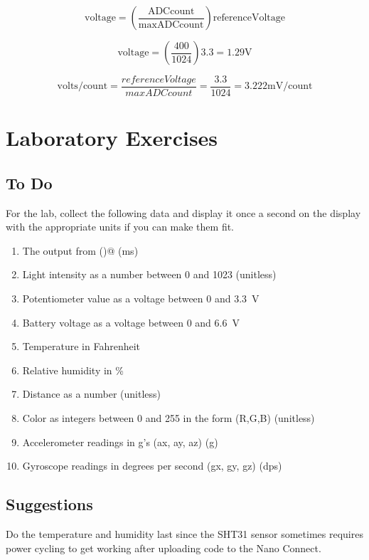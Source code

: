 \begin{equation}
	\label{eq:adc2volt}
	\mathrm{voltage} = \left(\frac{\mathrm{ADCcount}}{\mathrm{maxADCcount}}\right)\mathrm{referenceVoltage}
\end{equation}

\begin{equation}
	\label{eq:adc2voltex}
	\mathrm{voltage} = \left(\frac{400}{1024}\right)3.3 = 1.29\mathrm{V}
\end{equation}

\begin{equation}
	\label{eq:adcpercount}
	\mathrm{volts/count} = \frac{referenceVoltage}{maxADCcount} = \frac{3.3}{1024} = 3.222\mathrm{mV}/\mathrm{count}
\end{equation}

\section{Laboratory Exercises}
\subsection{To Do}
For the lab, collect the following data and display it once a second on the display with the 
appropriate units if you can make them fit.
\begin{enumerate}
	\item The output from \lstinline@millis()@ (ms)
	\item Light intensity as a number between 0 and 1023 (unitless)
	\item Potentiometer value as a voltage between 0 and 3.3~V
	\item Battery voltage as a voltage between 0 and 6.6~V
	\item Temperature in Fahrenheit
	\item Relative humidity in \%
	\item Distance as a number (unitless)
	\item Color as integers between 0 and 255 in the form (R,G,B) (unitless)
	\item Accelerometer readings in g's (ax, ay, az) (g)
	\item Gyroscope readings in degrees per second (gx, gy, gz) (dps)
\end{enumerate}

\subsection{Suggestions}
Do the temperature and humidity last since the SHT31 sensor sometimes requires power cycling 
to get working after uploading code to the Nano Connect.

